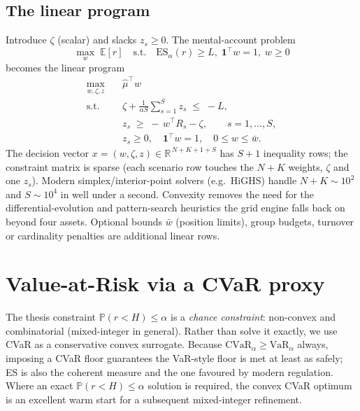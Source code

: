 \documentclass[11pt]{article}
\newcommand{\R}{\mathbb{R}}
\newcommand{\E}{\mathbb{E}}
\newcommand{\Prob}{\mathbb{P}}
\newcommand{\T}{^{\!\top}}
\newcommand{\ind}{\mathbf{1}}
\begin{document}
\subsection*{The linear program}
Introduce $\zeta$ (scalar) and slacks $z_s\ge 0$. The mental-account problem
\[
   \max_{w}\; \E[r] \quad\text{s.t.}\quad \mathrm{ES}_\alpha(r)\ge L,\;
   \ind\T w = 1,\; w\ge 0
\]
becomes the linear program
\[
\boxed{
\begin{aligned}
\max_{w,\zeta,z}\quad & \widehat\mu\T w \\
\text{s.t.}\quad
 & \zeta + \frac{1}{\alpha S}\sum_{s=1}^{S} z_s \;\le\; -L, \\
 & z_s \;\ge\; -\,w\T R_s - \zeta, \qquad s=1,\dots,S, \\
 & z_s \ge 0,\quad \ind\T w = 1,\quad 0 \le w \le \bar w .
\end{aligned}}
\]
The decision vector $x=(w,\zeta,z)\in\R^{\,N+K+1+S}$ has $S+1$ inequality rows; the
constraint matrix is sparse (each scenario row touches the $N{+}K$ weights, $\zeta$
and one $z_s$). Modern simplex/interior-point solvers (e.g.\ HiGHS) handle
$N+K\sim10^{2}$ and $S\sim10^{4}$ in well under a second. Convexity removes the need
for the differential-evolution and pattern-search heuristics the grid engine falls
back on beyond four assets. Optional bounds $\bar w$ (position limits), group budgets,
turnover or cardinality penalties are additional linear rows.

\section{Value-at-Risk via a CVaR proxy}
The thesis constraint $\Prob(r<H)\le\alpha$ is a \emph{chance constraint}:
non-convex and combinatorial (mixed-integer in general). Rather than solve it
exactly, we use CVaR as a conservative convex surrogate. Because
$\mathrm{CVaR}_\alpha \ge \mathrm{VaR}_\alpha$ always, imposing a CVaR floor
guarantees the VaR-style floor is met at least as safely; ES is also the coherent
measure and the one favoured by modern regulation. Where an exact
$\Prob(r<H)\le\alpha$ solution is required, the convex CVaR optimum is an excellent
warm start for a subsequent mixed-integer refinement.
\end{document}
